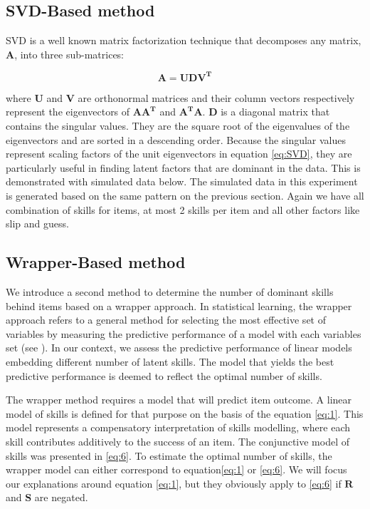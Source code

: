 \subsection{SVD-Based method}

SVD is a well known matrix factorization technique that decomposes any matrix, $\mathbf{A}$, into three sub-matrices: 

\begin{equation}
\mathbf{A}=\mathbf{UDV^{T}}\label{eq:SVD}
\end{equation}


where $\mathbf{U}$ and $\mathbf{V}$ are orthonormal matrices and their column vectors respectively represent the eigenvectors of $\mathbf{\mathbf{A}A^{T}}$ and $\mathbf{A^{T}\mathbf{A}}$. $\mathbf{D}$ is a diagonal matrix that contains the singular values. They are the square root of the eigenvalues of the eigenvectors and are sorted in a descending order. Because the singular values represent scaling factors of the unit eigenvectors in equation \ref{eq:SVD}, they are particularly useful in finding latent factors that are dominant in the data. This is demonstrated with simulated data below. The simulated data in this experiment is generated based on the same pattern on the previous section. Again we have all combination of skills for items, at most 2 skills per item and all other factors like slip and guess.


\subsection{Wrapper-Based method}


We introduce a second method to determine the number of dominant skills behind items based on a wrapper approach. In statistical learning, the wrapper approach refers to a general method for selecting the most effective set of variables by measuring the predictive performance of a model with each variables set (see \citep{Guyon2003}). In our context, we assess the predictive performance of linear models embedding different number of latent skills. The model that yields the best predictive performance is deemed to reflect the optimal number of skills.

The wrapper method requires a model that will predict item outcome. A linear model of skills is defined for that purpose on the basis of the equation \ref{eq:1}. This model represents a compensatory interpretation of skills modelling, where each skill contributes additively to the success of an item. The conjunctive model of skills was presented in \ref{eq:6}. To estimate the optimal number of skills, the wrapper model can either correspond to equation\ref{eq:1} or \ref{eq:6}. We will focus our explanations around equation \ref{eq:1}, but they obviously apply to \ref{eq:6} if $\mathbf{R}$ and $\mathbf{S}$ are negated.

